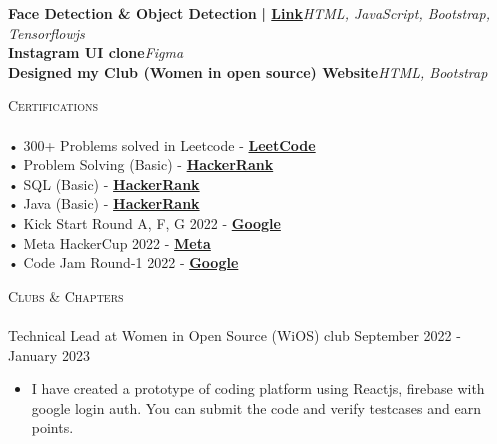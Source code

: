\documentclass[a4paper]{article}
\newcommand{\lineunder} {
    \vspace*{-8pt} \\
    \hspace*{-18pt} \hrulefill \\
}
\newcommand{\header} [1] {
    {\hspace*{-18pt}\vspace*{6pt} \textsc{#1}}
    \vspace*{-6pt} \lineunder
}
\begin{document}
\vspace*{2mm}
      {\textbf{Face Detection \& Object Detection}}\textbf{ | \href{https://vijay-object-detection.vercel.app/}{Link}}\hfill{\sl HTML, JavaScript, Bootstrap, Tensorflowjs}\\

\vspace*{2mm}
      {\textbf{Instagram UI clone}}\hfill{\sl Figma}\\

\vspace*{2mm}
      {\textbf{Designed my Club (Women in open source) Website}}\hfill{\sl HTML, Bootstrap}\\

\vspace*{2mm}
      

      \header{Certifications}
      \vspace{2mm}
      • 300+ Problems solved in Leetcode - \textbf{\href{https://leetcode.com/reddyvijay1667/}{LeetCode}}\\
\vspace*{1mm}
      • Problem Solving (Basic) - \textbf{\href{https://www.hackerrank.com/certificates/fd54720428ca}{HackerRank}}\\
\vspace*{1mm}
      • SQL (Basic) - \textbf{\href{https://www.hackerrank.com/certificates/fa059fcac1ad}{HackerRank}}\\
\vspace*{1mm}
      • Java (Basic) - \textbf{\href{https://www.hackerrank.com/certificates/1c7fb5da764f}{HackerRank}}\\
\vspace*{1mm}
      • Kick Start Round A, F, G 2022 - \textbf{\href{https://drive.google.com/file/d/1wW5pumlvXhk1Hz\_PRRUtEiM2pje5NQ3S/view?usp=share\_link}{Google}}\\
\vspace*{1mm}
      • Meta HackerCup 2022 - \textbf{\href{https://drive.google.com/file/d/1UauRImdSYiJi8-p9xI4TLVS0PDilKF2Q/view}{Meta}}\\
\vspace*{1mm}
      • Code Jam Round-1 2022 - \textbf{\href{https://drive.google.com/file/u/1/d/1Xr-qLMdwrGhjHZ\_EW7ynSL\_5lyUTWGJs/view?usp=sharing}{Google}}\\
\vspace*{1mm}
      \vspace{2mm}

      \header{Clubs \& Chapters}
      \vspace{2mm} 
      Technical Lead at Women in Open Source (WiOS) club \hfill September 2022 - January 2023\\
      \begin{itemize} \itemsep -3pt
      \item[] I have created a prototype of coding platform using Reactjs, firebase with google login auth. You can submit the code and verify testcases and earn points.
      \end{itemize}
\vspace*{1mm}

    \ 
    
\end{document}
